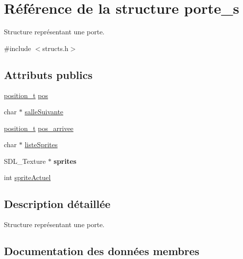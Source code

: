 \hypertarget{structporte__s}{}\section{Référence de la structure porte\+\_\+s}
\label{structporte__s}


Structure représentant une porte.  




{\ttfamily \#include $<$structs.\+h$>$}

\subsection*{Attributs publics}
\begin{DoxyCompactItemize}
\item 
\hyperlink{structposition__s}{position\+\_\+t} \hyperlink{structporte__s_a9e3c1bbfc207fb5ae26ed3c348ae9602}{pos}
\item 
char $\ast$ \hyperlink{structporte__s_ae89eb735de3e232b85236a603bf004d4}{salle\+Suivante}
\item 
\hyperlink{structposition__s}{position\+\_\+t} \hyperlink{structporte__s_a5f0b093b4c08255187a3dd261ff9e638}{pos\+\_\+arrivee}
\item 
char $\ast$ \hyperlink{structporte__s_aa55e29e3a22ae8711ea6ff4de335feee}{liste\+Sprites}
\item 
\mbox{\label{structporte__s_ac2c6fbd516cc31f3b68f29541f4fff06}} 
S\+D\+L\+\_\+\+Texture $\ast$ {\bfseries sprites}
\item 
int \hyperlink{structporte__s_af7204aec8f2a5b1641986d70aa74e077}{sprite\+Actuel}
\end{DoxyCompactItemize}


\subsection{Description détaillée}
Structure représentant une porte. 

\subsection{Documentation des données membres}
\mbox{\label{structporte__s_aa55e29e3a22ae8711ea6ff4de335feee}} 
